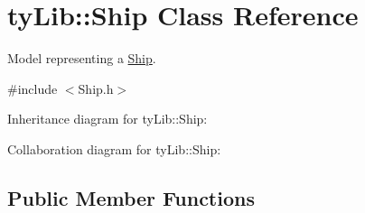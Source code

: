 \hypertarget{classty_lib_1_1_ship}{}\section{ty\+Lib\+:\+:Ship Class Reference}
\label{classty_lib_1_1_ship}


Model representing a \hyperlink{classty_lib_1_1_ship}{Ship}.  




{\ttfamily \#include $<$Ship.\+h$>$}



Inheritance diagram for ty\+Lib\+:\+:Ship\+:


Collaboration diagram for ty\+Lib\+:\+:Ship\+:
\subsection*{Public Member Functions}
